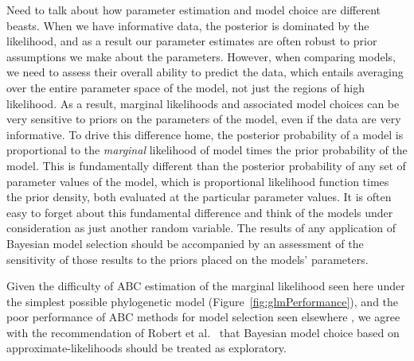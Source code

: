 Need to talk about how parameter estimation and model choice are different
beasts.
When we have informative data, the posterior is dominated by the likelihood,
and as a result our parameter estimates are often robust to prior assumptions
we make about the parameters.
However, when comparing models, we need to assess their overall ability to
predict the data, which entails averaging over the entire parameter space of
the model, not just the regions of high likelihood.
As a result, marginal likelihoods and associated model choices can be very
sensitive to priors on the parameters of the model, even if the data are very
informative.
To drive this difference home, the posterior probability of a model is
proportional to the \emph{marginal} likelihood of model times the prior
probability of the model.
This is fundamentally different than the posterior probability of any set of
parameter values of the model, which is proportional likelihood function times
the prior density, both evaluated at the particular parameter values.
It is often easy to forget about this fundamental difference and think
of the models under consideration as just another random variable.
The results of any application of Bayesian model selection should be
accompanied by an assessment of the sensitivity of those results to the priors
placed on the models' parameters.

Given the difficulty of ABC estimation of the marginal likelihood seen here
under the simplest possible phylogenetic model
(Figure~\ref{fig:glmPerformance}), and the poor performance of ABC methods for
model selection seen elsewhere \citep{Robert2011,Oaks2012,Oaks2014reply}, we
agree with the recommendation of Robert et al.\ \citeyear{Robert2011} that
Bayesian model choice based on approximate-likelihoods should be treated as
exploratory.

